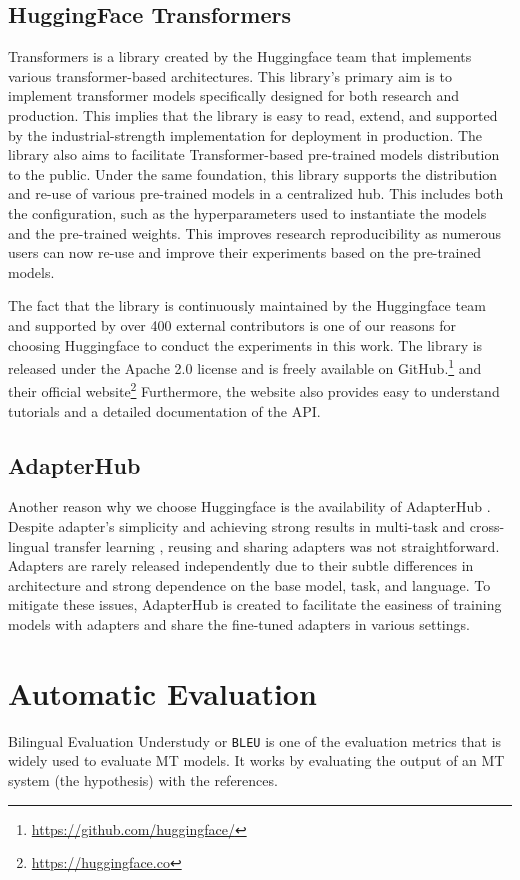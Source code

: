 \subsection{HuggingFace Transformers}
Transformers \cite{wolf2020transformers} is a library created by the Huggingface team that implements various transformer-based architectures. This library's primary aim is to implement transformer models specifically designed for both research and production. This implies that the library is easy to read, extend, and supported by the industrial-strength implementation for deployment in production. The library also aims to facilitate Transformer-based pre-trained models distribution to the public. Under the same foundation, this library supports the distribution and re-use of various pre-trained models in a centralized hub. This includes both the configuration, such as the hyperparameters used to instantiate the models and the pre-trained weights. This improves research reproducibility as numerous users can now re-use and improve their experiments based on the pre-trained models.

The fact that the library is continuously maintained by the Huggingface team and supported by over 400 external contributors is one of our reasons for choosing Huggingface to conduct the experiments in this work. The library is released under the Apache 2.0 license and is freely available on GitHub.\footnote{\url{https://github.com/huggingface/}} and their official website\footnote{\url{https://huggingface.co}} Furthermore, the website also provides easy to understand tutorials and a detailed documentation of the API.

\subsection{AdapterHub}
Another reason why we choose Huggingface is the availability of AdapterHub \cite{pfeiffer-etal-2020-adapterhub}. Despite adapter's simplicity and achieving strong results in multi-task and cross-lingual transfer learning \cite{pfeiffer2021adapterfusion,pfeiffer2020madx}, reusing and sharing adapters was not straightforward. Adapters are rarely released independently due to their subtle differences in architecture and strong dependence on the base model, task, and language. To mitigate these issues, AdapterHub is created to facilitate the easiness of training models with adapters and share the fine-tuned adapters in various settings.

\section{Automatic Evaluation}
\label{sec:aeval}
Bilingual Evaluation Understudy or \texttt{BLEU} \cite{BLEU} is one of the evaluation metrics that is widely used to evaluate MT models. It works by evaluating the output of an MT system (the hypothesis) with the references.

